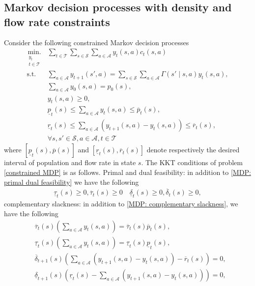 \subsection{Markov decision processes with density and flow rate constraints}
Consider the following constrained Markov decision processes
\begin{equation}
\begin{aligned}
\underset{\substack{y_t\\ t\in\mathcal{T}}}{\mbox{min.}} & \sum\limits_{t\in\mathcal{T}}\sum\limits_{s\in\mathcal{S}} \sum\limits_{a\in\mathcal{A}} y_t(s, a)c_t(s, a)\\
\mbox{s.t.} &\sum\limits_{a\in\mathcal{A}} y_{t+1}(s', a) = \sum\limits_{s\in\mathcal{S}}\sum\limits_{a\in\mathcal{A}}\Gamma(s'\mid s, a)y_t(s, a),\\
&\sum\limits_{a\in\mathcal{A}}y_0(s, a)=p_0(s),\\
&y_t(s, a)\geq 0,\\
&\underline{p}_t(s)\leq\sum\limits_{a\in\mathcal{A}}y_t(s, a)\leq\overline{p}_t(s),\\
&\underline{r}_{t}(s)\leq\sum\limits_{a\in\mathcal{A}}(y_{t+1}(s, a)-y_{t}(s, a))\leq \overline{r}_{t}(s),\\
&\forall s, s'\in\mathcal{S}, a\in\mathcal{A}, t\in\mathcal{T}
\end{aligned}\label{constrained MDP}
\end{equation}
where \([\underline{p}_t(s), \overline{p}(s)]\) and \([ \underline{r}_t(s),  \overline{r}_t(s)]\) denote respectively the desired interval of population and flow rate in state \(s\).  The KKT conditions of problem \eqref{constrained MDP} is as follows. Primal and dual feasibility: in addition to  \eqref{MDP: primal dual feasibility} we have the following
\begin{equation}
\begin{aligned}
\underline{\tau}_t(s)\geq 0,\overline{\tau}_t(s)\geq 0 \quad \underline{\delta}_t(s)\geq 0, \overline{\delta}_t(s)\geq 0,
\end{aligned}\label{consMDP: primal dual feasibility}
\end{equation}
complementary slackness: in addition to \eqref{MDP: complementary slackness}, we have the following
\begin{equation}
\begin{aligned}
&\overline{\tau}_t(s)\left(\sum\limits_{a\in\mathcal{A}}y_t(s, a)\right)=\overline{\tau}_t(s)\overline{p}_t(s),\\
&\underline{\tau}_t(s)\left(\sum\limits_{a\in\mathcal{A}}y_t(s, a)\right)=\underline{\tau}_t(s)\underline{p}_t(s),\\
&\overline{\delta}_{t+1}(s)\left(\sum\limits_{a\in\mathcal{A}}(y_{t+1}(s, a)-y_t(s, a))-\overline{r}_{t}(s)\right)=0,\\
&\underline{\delta}_{t+1}(s)\left(\underline{r}_{t}(s)-\sum\limits_{a\in\mathcal{A}}(y_{t+1}(s, a)-y_t(s, a))\right)=0,
\end{aligned}\label{consMDP: complementary slackness}
\end{equation}
